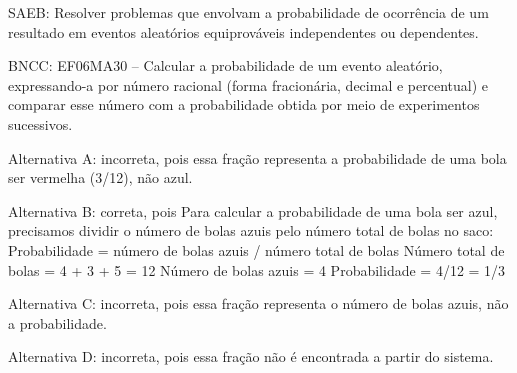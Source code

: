 SAEB: Resolver problemas que envolvam a probabilidade de ocorrência de
um resultado em eventos aleatórios equiprováveis independentes ou
dependentes.

BNCC: EF06MA30 -- Calcular a probabilidade de um evento aleatório,
expressando-a por número racional (forma fracionária, decimal e
percentual) e comparar esse número com a probabilidade obtida por meio
de experimentos sucessivos.

Alternativa A: incorreta, pois essa fração representa a probabilidade de
uma bola ser vermelha (3/12), não azul.

Alternativa B: correta, pois Para calcular a probabilidade de uma bola
ser azul, precisamos dividir o número de bolas azuis pelo número total
de bolas no saco: Probabilidade = número de bolas azuis / número total
de bolas Número total de bolas = 4 + 3 + 5 = 12 Número de bolas azuis =
4 Probabilidade = 4/12 = 1/3

Alternativa C: incorreta, pois essa fração representa o número de bolas
azuis, não a probabilidade.

Alternativa D: incorreta, pois essa fração não é encontrada a partir do
sistema.
